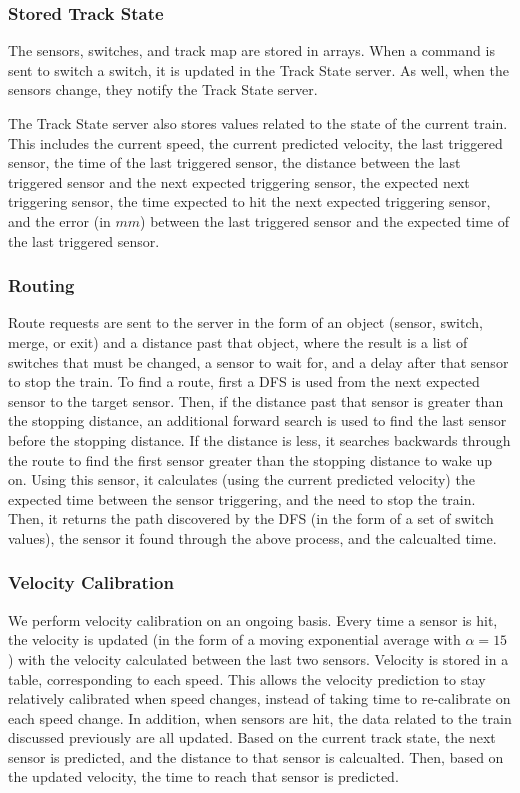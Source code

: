 \documentclass{article}
\begin{document}
\subsubsection{ Stored Track State }
The sensors, switches, and track map are stored in arrays. When a command is sent to switch a switch, it is updated in the Track State server. As well, when the sensors change, they notify the Track State server.

The Track State server also stores values related to the state of the current train. This includes the current speed, the current predicted velocity, the last triggered sensor, the time of the last triggered sensor, the distance between the last triggered sensor and the next expected triggering sensor, the expected next triggering sensor, the time expected to hit the next expected triggering sensor, and the error (in $mm$) between the last triggered sensor and the expected time of the last triggered sensor.

\subsubsection{ Routing }
Route requests are sent to the server in the form of an object (sensor, switch, merge, or exit) and a distance past that object, where the result is a list of switches that must be changed, a sensor to wait for, and a delay after that sensor to stop the train.
To find a route, first a DFS is used from the next expected sensor to the target sensor. Then, if the distance past that sensor is greater than the stopping distance, an additional forward search is used to find the last sensor before the stopping distance. If the distance is less, it searches backwards through the route to find the first sensor greater than the stopping distance to wake up on.
Using this sensor, it calculates (using the current predicted velocity) the expected time between the sensor triggering, and the need to stop the train.
Then, it returns the path discovered by the DFS (in the form of a set of switch values), the sensor it found through the above process, and the calcualted time.

\subsubsection{ Velocity Calibration }
We perform velocity calibration on an ongoing basis. Every time a sensor is hit, the velocity is updated (in the form of a moving exponential average with $\alpha = 15$) with the velocity calculated between the last two sensors.
Velocity is stored in a table, corresponding to each speed. This allows the velocity prediction to stay relatively calibrated when speed changes, instead of taking time to re-calibrate on each speed change.
In addition, when sensors are hit, the data related to the train discussed previously are all updated. Based on the current track state, the next sensor is predicted, and the distance to that sensor is calcualted. Then, based on the updated velocity, the time to reach that sensor is predicted. 
\end{document}
